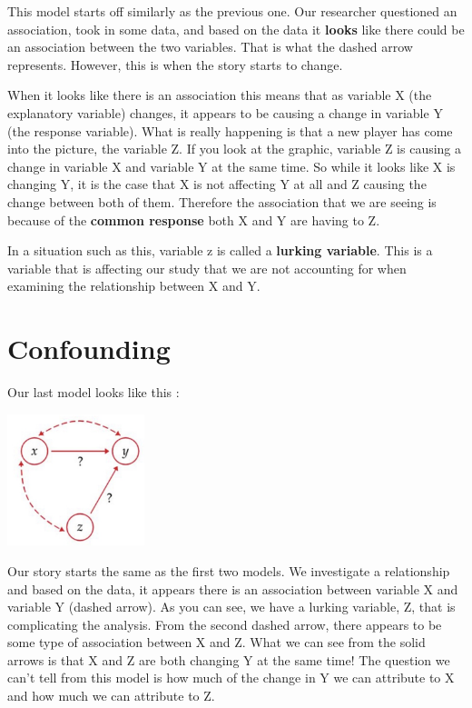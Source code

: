 \documentclass[
  letterpaper,
  DIV=11,
  numbers=noendperiod]{scrreprt}
\begin{document}
This model starts off similarly as the previous one. Our researcher
questioned an association, took in some data, and based on the data it
\textbf{looks} like there could be an association between the two
variables. That is what the dashed arrow represents. However, this is
when the story starts to change.

When it looks like there is an association this means that as variable X
(the explanatory variable) changes, it appears to be causing a change in
variable Y (the response variable). What is really happening is that a
new player has come into the picture, the variable Z. If you look at the
graphic, variable Z is causing a change in variable X and variable Y at
the same time. So while it looks like X is changing Y, it is the case
that X is not affecting Y at all and Z causing the change between both
of them. Therefore the association that we are seeing is because of the
\textbf{common response} both X and Y are having to Z.

In a situation such as this, variable z is called a \textbf{lurking
variable}. This is a variable that is affecting our study that we are
not accounting for when examining the relationship between X and Y.

\section*{Confounding}\label{confounding}


Our last model looks like this :

\includegraphics[width=0.3\textwidth,height=\textheight]{./images/IDV_3.jpg}

Our story starts the same as the first two models. We investigate a
relationship and based on the data, it appears there is an association
between variable X and variable Y (dashed arrow). As you can see, we
have a lurking variable, Z, that is complicating the analysis. From the
second dashed arrow, there appears to be some type of association
between X and Z. What we can see from the solid arrows is that X and Z
are both changing Y at the same time! The question we can't tell from
this model is how much of the change in Y we can attribute to X and how
much we can attribute to Z.
\end{document}
